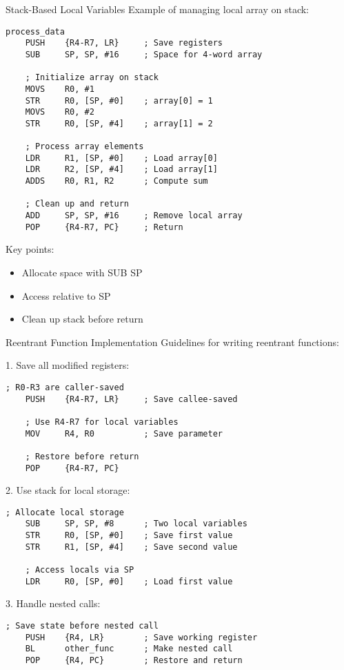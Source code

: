 \begin{example2}{Stack-Based Local Variables}
Example of managing local array on stack:
\begin{lstlisting}[language=armasm, style=basesmol]
process_data
    PUSH    {R4-R7, LR}     ; Save registers
    SUB     SP, SP, #16     ; Space for 4-word array
    
    ; Initialize array on stack
    MOVS    R0, #1          
    STR     R0, [SP, #0]    ; array[0] = 1
    MOVS    R0, #2
    STR     R0, [SP, #4]    ; array[1] = 2
    
    ; Process array elements
    LDR     R1, [SP, #0]    ; Load array[0]
    LDR     R2, [SP, #4]    ; Load array[1]
    ADDS    R0, R1, R2      ; Compute sum
    
    ; Clean up and return
    ADD     SP, SP, #16     ; Remove local array
    POP     {R4-R7, PC}     ; Return
\end{lstlisting}

Key points:
\begin{itemize}
  \item Allocate space with SUB SP
  \item Access relative to SP
  \item Clean up stack before return
\end{itemize}
\end{example2}

\begin{KR}{Reentrant Function Implementation}
Guidelines for writing reentrant functions:

1. Save all modified registers:
\begin{lstlisting}[language=armasm, style=basesmol]
    ; R0-R3 are caller-saved
    PUSH    {R4-R7, LR}     ; Save callee-saved
    
    ; Use R4-R7 for local variables
    MOV     R4, R0          ; Save parameter
    
    ; Restore before return
    POP     {R4-R7, PC}
\end{lstlisting}

2. Use stack for local storage:
\begin{lstlisting}[language=armasm, style=basesmol]
    ; Allocate local storage
    SUB     SP, SP, #8      ; Two local variables
    STR     R0, [SP, #0]    ; Save first value
    STR     R1, [SP, #4]    ; Save second value
    
    ; Access locals via SP
    LDR     R0, [SP, #0]    ; Load first value
\end{lstlisting}

3. Handle nested calls:
\begin{lstlisting}[language=armasm, style=basesmol]
    ; Save state before nested call
    PUSH    {R4, LR}        ; Save working register
    BL      other_func      ; Make nested call
    POP     {R4, PC}        ; Restore and return
\end{lstlisting}
\end{KR}

